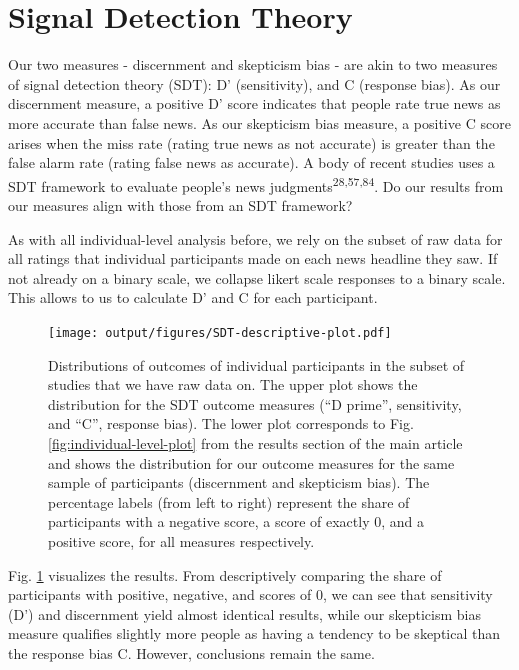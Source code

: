 \documentclass[
  man]{apa6}
\begin{document}
\section{Signal Detection Theory}\label{signal-detection-theory}

Our two measures - discernment and skepticism bias - are akin to two measures of signal detection theory (SDT): D' (sensitivity), and C (response bias). As our discernment measure, a positive D' score indicates that people rate true news as more accurate than false news. As our skepticism bias measure, a positive C score arises when the miss rate (rating true news as not accurate) is greater than the false alarm rate (rating false news as accurate). A body of recent studies uses a SDT framework to evaluate people's news judgments\textsuperscript{28,57,84}. Do our results from our measures align with those from an SDT framework?

As with all individual-level analysis before, we rely on the subset of raw data for all ratings that individual participants made on each news headline they saw. If not already on a binary scale, we collapse likert scale responses to a binary scale. This allows to us to calculate D' and C for each participant.



\begin{figure}
\centering
\texttt{[image: output/figures/SDT-descriptive-plot.pdf]}
\caption{\label{fig:SDT-descriptive-plot}Distributions of outcomes of individual participants in the subset of studies that we have raw data on. The upper plot shows the distribution for the SDT outcome measures (``D prime'', sensitivity, and ``C'', response bias). The lower plot corresponds to Fig. \ref{fig:individual-level-plot} from the results section of the main article and shows the distribution for our outcome measures for the same sample of participants (discernment and skepticism bias). The percentage labels (from left to right) represent the share of participants with a negative score, a score of exactly 0, and a positive score, for all measures respectively.}
\end{figure}

Fig. \ref{fig:SDT-descriptive-plot} visualizes the results. From descriptively comparing the share of participants with positive, negative, and scores of 0, we can see that sensitivity (D') and discernment yield almost identical results, while our skepticism bias measure qualifies slightly more people as having a tendency to be skeptical than the response bias C. However, conclusions remain the same.
\end{document}

